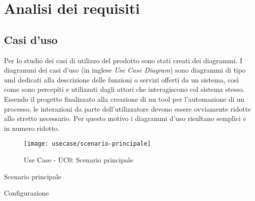 
\chapter{Analisi dei requisiti}
\label{cap:analisi-requisiti}


\section{Casi d'uso}

Per lo studio dei casi di utilizzo del prodotto sono stati creati dei diagrammi.
I diagrammi dei casi d'uso (in inglese \emph{Use Case Diagram}) sono diagrammi di tipo \gls{uml} dedicati alla descrizione delle funzioni o servizi offerti da un sistema, così come sono percepiti e utilizzati dagli attori che interagiscono col sistema stesso.
Essendo il progetto finalizzato alla creazione di un tool per l'automazione di un processo, le interazioni da parte dell'utilizzatore devono essere ovviamente ridotte allo stretto necessario. Per questo motivo i diagrammi d'uso risultano semplici e in numero ridotto.

\begin{figure}[!h]
    \centering
    \texttt{[image: usecase/scenario-principale]}
    \caption{Use Case - UC0: Scenario principale}
\end{figure}

\begin{usecase}{0}{Scenario principale}
\label{uc:scenario-principale}
\end{usecase}


\begin{usecase}{1}{Configurazione}
\label{uc:scenario-principale}
\end{usecase}



